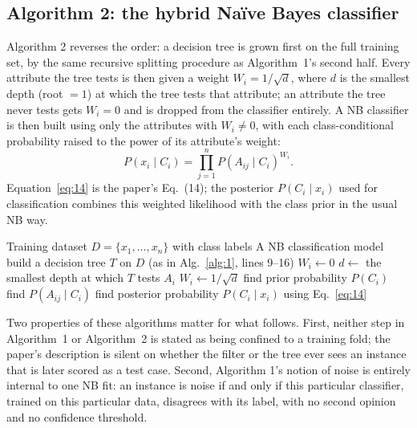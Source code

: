 \subsection{Algorithm 2: the hybrid Na\"ive Bayes classifier}

Algorithm 2 reverses the order: a decision tree is grown first on the full
training set, by the same recursive splitting procedure as Algorithm~1's
second half. Every attribute the tree tests is then given a weight
$W_i = 1/\sqrt{d}$, where $d$ is the smallest depth (root $=1$) at which
the tree tests that attribute; an attribute the tree never tests gets
$W_i = 0$ and is dropped from the classifier entirely. A NB classifier is
then built using only the attributes with $W_i \neq 0$, with each
class-conditional probability raised to the power of its attribute's
weight:
\begin{equation}
P(x_i \mid C_i) = \prod_{j=1}^{n} P(A_{ij}\mid C_i)^{W_i}. \label{eq:14}
\end{equation}
Equation~\eqref{eq:14} is the paper's Eq.~(14); the posterior
$P(C_i\mid x_i)$ used for classification combines this weighted likelihood
with the class prior in the usual NB way.

\begin{algorithm}[t]
\caption{Hybrid Na\"ive Bayes classifier (Farid et al.~\cite{farid2014hybrid}, Alg.\ 2)}
\label{alg:2}
\begin{algorithmic}[1]
\Require Training dataset $D=\{x_1,\dots,x_n\}$ with class labels
\Ensure A NB classification model
\State build a decision tree $T$ on $D$ (as in Alg.~\ref{alg:1}, lines 9--16)
    \State $W_i \gets 0$
  \Else
    \State $d \gets$ the smallest depth at which $T$ tests $A_i$
    \State $W_i \gets 1/\sqrt{d}$
  \EndIf
\EndFor
{}
  \State find prior probability $P(C_i)$
\EndFor
{}
    \State find $P(A_{ij}\mid C_i)$
  \EndFor
\EndFor
{}
  \State find posterior probability $P(C_i\mid x_i)$ using Eq.~\eqref{eq:14}
\EndFor
\end{algorithmic}
\end{algorithm}

Two properties of these algorithms matter for what follows. First, neither
step in Algorithm~1 or Algorithm~2 is stated as being confined to a
training fold; the paper's description is silent on whether the filter or
the tree ever sees an instance that is later scored as a test case. Second,
Algorithm 1's notion of noise is entirely internal to one NB fit: an
instance is noise if and only if this particular classifier, trained on
this particular data, disagrees with its label, with no second opinion and
no confidence threshold.
